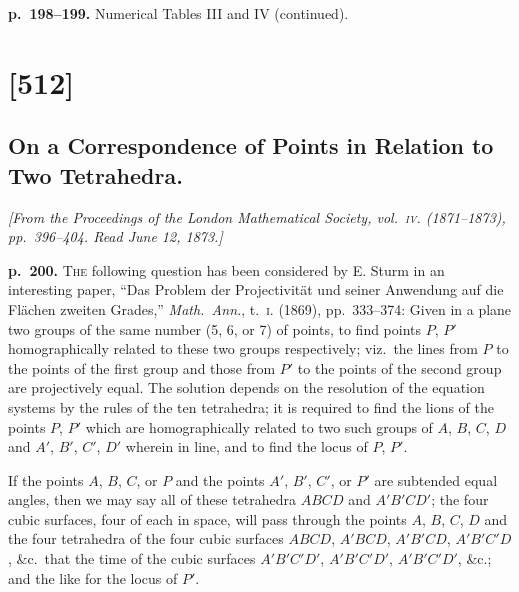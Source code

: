 \documentclass[11pt,a4paper]{article}
\begin{document}
\clearpage

\noindent
\textbf{p.~198--199.}  Numerical Tables III and IV (continued).


\clearpage

\section{[512]}
\subsection{On a Correspondence of Points in Relation to Two Tetrahedra.}

\begin{center}
\textit{[From the Proceedings of the London Mathematical Society, vol.\ \textsc{iv}. (1871--1873),
pp.\ 396--404.  Read June 12, 1873.]}
\end{center}

\noindent
\textbf{p.~200.}  \textsc{The} following question has been considered by E. Sturm in an interesting paper,
``Das Problem der Projectivit\"at und seiner Anwendung auf die Fl\"achen zweiten
Grades,'' \textit{Math.\ Ann.}, t.\ \textsc{i.} (1869), pp.\ 333--374:  Given in a plane two groups of the
same number (5, 6, or 7) of points, to find points $P$, $P'$ homographically related to
these two groups respectively; viz.\ the lines from $P$ to the points of the first group
and those from $P'$ to the points of the second group are projectively equal.  The
solution depends on the resolution of the equation systems by the rules of the
ten tetrahedra; it is required to find the lions of the points $P$, $P'$ which are
homographically related to two such groups of $A$, $B$, $C$, $D$ and $A'$, $B'$, $C'$, $D'$ wherein
in line, and to find the locus of $P$, $P'$.

If the points $A$, $B$, $C$, or $P$ and the points $A'$, $B'$, $C'$, or $P'$ are subtended equal angles, then we may say all of these tetrahedra $ABCD$ and $A'B'CD'$; the four cubic surfaces, four of each in space, will pass through the points $A$, $B$, $C$, $D$ and the four tetrahedra of the four cubic surfaces $ABCD$, $A'BCD$, $A'B'CD$, $A'B'C'D$, \&c.\ that the time of the cubic surfaces $A'B'C'D'$, $A'B'C'D'$, $A'B'C'D'$, \&c.; and the like for the locus of $P'$.
\end{document}
